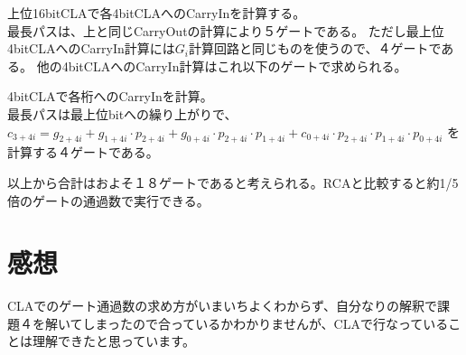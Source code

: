 \documentclass{jarticle}
\begin{document}
  上位16bitCLAで各4bitCLAへのCarryInを計算する。\\
  最長パスは、上と同じCarryOutの計算により５ゲートである。
  ただし最上位4bitCLAへのCarryIn計算には$G_i$計算回路と同じものを使うので、４ゲートである。
  他の4bitCLAへのCarryIn計算はこれ以下のゲートで求められる。

  4bitCLAで各桁へのCarryInを計算。\\
  最長パスは最上位bitへの繰り上がりで、
  $c_{3 + 4i} = g_{2 + 4i} + g_{1 + 4i} \cdot p_{2 + 4i} + g_{0 + 4i} \cdot p_{2 + 4i} \cdot p_{1 + 4i} + c_{0 + 4i} \cdot p_{2 + 4i} \cdot p_{1 + 4i} \cdot p_{0 + 4i}$
  を計算する４ゲートである。

  以上から合計はおよそ１８ゲートであると考えられる。RCAと比較すると約1/5倍のゲートの通過数で実行できる。
  \section{感想}
  CLAでのゲート通過数の求め方がいまいちよくわからず、自分なりの解釈で課題４を解いてしまったので合っているかわかりませんが、CLAで行なっていることは理解できたと思っています。
\end{document}
